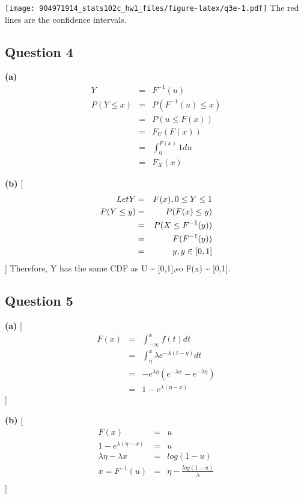 \documentclass[
]{article}
\begin{document}
\texttt{[image: 904971914\_stats102c\_hw1\_files/figure-latex/q3e-1.pdf]}
The red lines are the confidence intervals.

\hypertarget{question-4}{%
\subsection{Question 4}\label{question-4}}

\textbf{(a)} \[
\begin{eqnarray}
Y&=&F^{-1}(u)\\
P(Y \leq x)&=& P(F^{-1}(u) \leq  x)\\
&=& P(u \leq F(x))\\
&=& F_U(F(x)) \\
&=& \int _0 ^ {F(x)} 1 du \\
&=& F_{X}(x) 
\end{eqnarray}
\]

\textbf{(b)} {[} \begin{eqnarray}
Let \space \space Y&=&F(x),0 \leq Y\leq 1  \\
P(Y \leq y)&=&P(F(x) \leq y)\\
&=&P(X \leq F^{-1}(y))\\
&=& F(F^{-1}(y))\\
&=& y, \space y \in[0,1]

\end{eqnarray} {]} Therefore, Y has the same CDF as U \textasciitilde{}
{[}0,1{]},so F(x) \textasciitilde{} {[}0,1{]}.

\hypertarget{question-5}{%
\subsection{Question 5}\label{question-5}}

\textbf{(a)} {[} \begin{eqnarray}
F(x) &=&\int_{-\infty}^xf(t)dt\\
&=& \int_{\eta}^x\lambda e^{-\lambda(t-\eta)}dt\\
&=& - e^{\lambda\eta} (e^{-\lambda x}-e^{-\lambda \eta})\\
&=& 1-e^{\lambda(\eta-x)}

\end{eqnarray} {]}

\textbf{(b)} {[} \begin{eqnarray}
F(x) &=& u\\
1-e^{\lambda(\eta - x)} &=& u \\
\lambda\eta - \lambda x &=& log(1-u)\\
x = F^{-1}(u) &=& \eta - \frac {log(1-u)} \lambda\\


\end{eqnarray} {]}
\end{document}
